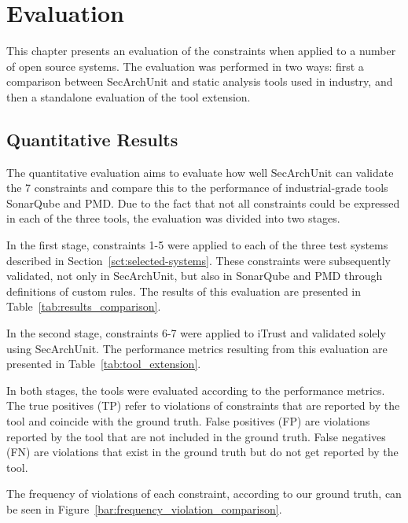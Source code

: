 \chapter{Evaluation}

This chapter presents an evaluation of the constraints when applied to a number of open source systems. The evaluation was performed in two ways: first a comparison between SecArchUnit and static analysis tools used in industry, and then a standalone evaluation of the tool extension.

\section{Quantitative Results}
The quantitative evaluation aims to evaluate how well SecArchUnit can validate the 7 constraints and compare this to the performance of industrial-grade tools SonarQube and PMD. Due to the fact that not all constraints could be expressed in each of the three tools, the evaluation was divided into two stages.

In the first stage, constraints 1-5 were applied to each of the three test systems described in Section~\ref{sct:selected-systems}. These constraints were subsequently validated, not only in SecArchUnit, but also in SonarQube and PMD through definitions of custom rules. The results of this evaluation are presented in Table~\ref{tab:results_comparison}.



In the second stage, constraints 6-7 were applied to iTrust and validated solely using SecArchUnit. The performance metrics resulting from this evaluation are presented in Table~\ref{tab:tool_extension}.



In both stages, the tools were evaluated according to the performance metrics. The true positives (TP) refer to violations of constraints that are reported by the tool and coincide with the ground truth. False positives (FP) are violations reported by the tool that are not included in the ground truth. False negatives (FN) are violations that exist in the ground truth but do not get reported by the tool. 

The frequency of violations of each constraint, according to our ground truth, can be seen in Figure~\ref{bar:frequency_violation_comparison}.






